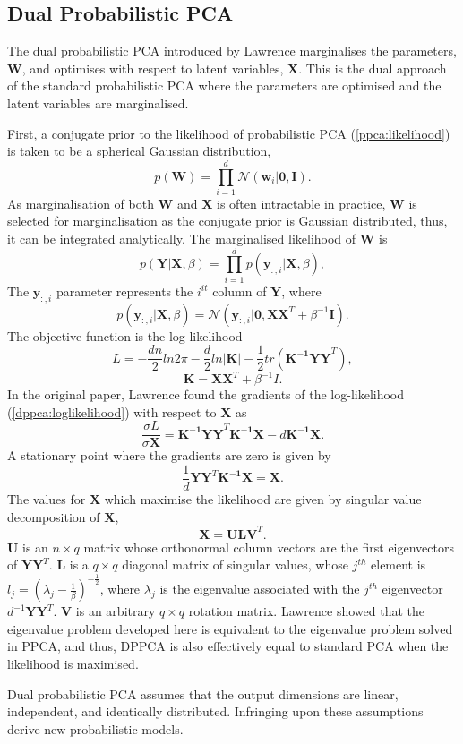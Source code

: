 \documentclass[ %
author={Dillon Keith Diep},
supervisor={Dr. Carl Henrik Ek},
degree={MEng},
title={ART-CG:},
subtitle={Assisted Real-time Content Generation of 3D Hair by Learning Manifolds},
type={Research},
year={2017} ]{dissertation}
\begin{document}
\subsection{Dual Probabilistic PCA}
The dual probabilistic PCA introduced by Lawrence marginalises the parameters, $\bm{W}$, and optimises with respect to latent variables, $\bm{X}$. This is the dual approach of the standard probabilistic PCA where the parameters are optimised and the latent variables are marginalised.

First, a conjugate prior to the likelihood of probabilistic PCA (\ref{ppca:likelihood}) is taken to be a spherical Gaussian distribution,
$$p(\bm{W})=\prod^d_{i=1}\mathcal{N}(\bm{w}_i|\bm{0,I}).$$
As marginalisation of both $\bm{W}$ and $\bm{X}$ is often intractable in practice, $\bm{W}$ is selected for marginalisation as the conjugate prior is Gaussian distributed, thus, it can be integrated analytically.
The marginalised likelihood of $\bm{W}$ is
$$p(\bm{Y|X},\beta)=\prod^d_{i=1}p(\bm{y}_{:,i}|\bm{X},\beta),$$
The $\bm{y}_{:,i}$ parameter represents the $i^{it}$ column of $\bm{Y}$, where
$$p(\bm{y}_{:,i}|\bm{X},\beta)=\mathcal{N}(\bm{y}_{:,i}|\bm{0,XX}^T+\beta^{-1}\bm{I}).$$
The objective function is the log-likelihood
\begin{equation} \label{dppca:loglikelihood}
L=-\frac{dn}{2}ln2\pi-\frac{d}{2}ln|\bm{K}|-\frac{1}{2}tr(\bm{K^{-1}YY}^T),
\end{equation}
$$\bm{K=XX}^T+\beta^{-1}I.$$
In the original paper, Lawrence found the gradients of the log-likelihood (\ref{dppca:loglikelihood}) with respect to $\bm{X}$ as
$$\frac{\sigma L}{\sigma \bm{X}}=\bm{K^{-1}YY}^T\bm{K^{-1}X}-d\bm{K^{-1}X}.$$ 
A stationary point where the gradients are zero is given by
$$\frac{1}{d}\bm{YY}^T\bm{K^{-1}X=X}.$$
The values for $\bm{X}$ which maximise the likelihood are given by singular value decomposition of $\bm{X}$,
$$\bm{X=ULV}^T.$$
$\bm{U}$ is an $n \times q$ matrix whose orthonormal column vectors are the first eigenvectors of $\bm{YY}^T$. $\bm{L}$ is a $q \times q$ diagonal matrix of singular values, whose $j^{th}$ element is $l_j=(\lambda_j-\frac{1}{\beta})^{-\frac{1}{2}}$, where $\lambda_j$ is the eigenvalue associated with the $j^{th}$ eigenvector $d^{-1}\bm{YY}^T$. $\bm{V}$ is an arbitrary $q\times q$ rotation matrix. Lawrence showed that the eigenvalue problem developed here is equivalent to the eigenvalue problem solved in PPCA, and thus, DPPCA is also effectively equal to standard PCA when the likelihood is maximised.

Dual probabilistic PCA assumes that the output dimensions are linear, independent, and identically distributed. Infringing upon these assumptions derive new probabilistic models.
\end{document}
